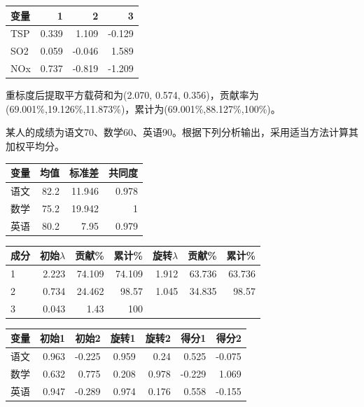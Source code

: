\begin{center}\small\setlength{\tabcolsep}{4pt}\renewcommand{\arraystretch}{1.18}\begin{tabular}{@{}lrrr@{}}
\toprule
变量 & 1 & 2 & 3 \\
\midrule

TSP & 0.339 & 1.109 & -0.129 \\
SO2 & 0.059 & -0.046 & 1.589 \\
NOx & 0.737 & -0.819 & -1.209 \\
\bottomrule\end{tabular}\end{center}

重标度后提取平方载荷和为(2.070, 0.574, 0.356)，贡献率为(69.001\%,19.126\%,11.873\%)，累计为(69.001\%,88.127\%,100\%)。




某人的成绩为语文70、数学60、英语90。根据下列分析输出，采用适当方法计算其加权平均分。

\begin{center}\small\setlength{\tabcolsep}{4pt}\renewcommand{\arraystretch}{1.18}\begin{tabular}{@{}lrrr@{}}
\toprule
变量 & 均值 & 标准差 & 共同度 \\
\midrule

语文 & 82.2 & 11.946 & 0.978 \\
数学 & 75.2 & 19.942 & 1 \\
英语 & 80.2 & 7.95 & 0.979 \\
\bottomrule\end{tabular}\end{center}

\begin{center}\small\setlength{\tabcolsep}{4pt}\renewcommand{\arraystretch}{1.18}\begin{tabular}{@{}lrrrrrr@{}}
\toprule
成分 & 初始\(\lambda\) & 贡献\% & 累计\% & 旋转\(\lambda\) & 贡献\% & 累计\% \\
\midrule

1 & 2.223 & 74.109 & 74.109 & 1.912 & 63.736 & 63.736 \\
2 & 0.734 & 24.462 & 98.57 & 1.045 & 34.835 & 98.57 \\
3 & 0.043 & 1.43 & 100 & & & \\
\bottomrule\end{tabular}\end{center}

\begin{center}\small\setlength{\tabcolsep}{4pt}\renewcommand{\arraystretch}{1.18}\begin{tabular}{@{}lrrrrrr@{}}
\toprule
变量 & 初始1 & 初始2 & 旋转1 & 旋转2 & 得分1 & 得分2 \\
\midrule

语文 & 0.963 & -0.225 & 0.959 & 0.24 & 0.525 & -0.075 \\
数学 & 0.632 & 0.775 & 0.208 & 0.978 & -0.229 & 1.069 \\
英语 & 0.947 & -0.289 & 0.974 & 0.176 & 0.558 & -0.155 \\
\bottomrule\end{tabular}\end{center}


